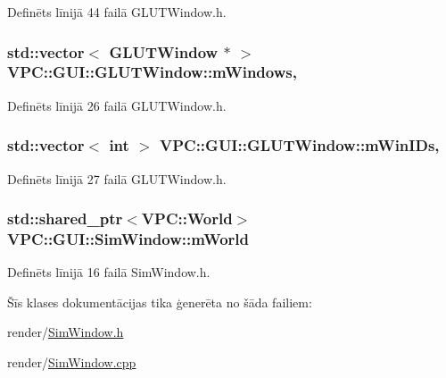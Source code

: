 Definēts līnijā 44 failā G\+L\+U\+T\+Window.\+h.

\subsubsection[{\texorpdfstring{m\+Windows}{mWindows}}]{\setlength{\rightskip}{0pt plus 5cm}std\+::vector$<$ {\bf G\+L\+U\+T\+Window} $\ast$ $>$ V\+P\+C\+::\+G\+U\+I\+::\+G\+L\+U\+T\+Window\+::m\+Windows\hspace{0.3cm}{\ttfamily [static]}, {\ttfamily [inherited]}}\hypertarget{class_v_p_c_1_1_g_u_i_1_1_g_l_u_t_window_aad2948c3a88afb3bc03f9bc54a81f285}{}\label{class_v_p_c_1_1_g_u_i_1_1_g_l_u_t_window_aad2948c3a88afb3bc03f9bc54a81f285}


Definēts līnijā 26 failā G\+L\+U\+T\+Window.\+h.

\subsubsection[{\texorpdfstring{m\+Win\+I\+Ds}{mWinIDs}}]{\setlength{\rightskip}{0pt plus 5cm}std\+::vector$<$ int $>$ V\+P\+C\+::\+G\+U\+I\+::\+G\+L\+U\+T\+Window\+::m\+Win\+I\+Ds\hspace{0.3cm}{\ttfamily [static]}, {\ttfamily [inherited]}}\hypertarget{class_v_p_c_1_1_g_u_i_1_1_g_l_u_t_window_a1ceb7745b98f3497579a0f4e8288419e}{}\label{class_v_p_c_1_1_g_u_i_1_1_g_l_u_t_window_a1ceb7745b98f3497579a0f4e8288419e}


Definēts līnijā 27 failā G\+L\+U\+T\+Window.\+h.

\subsubsection[{\texorpdfstring{m\+World}{mWorld}}]{\setlength{\rightskip}{0pt plus 5cm}std\+::shared\+\_\+ptr$<${\bf V\+P\+C\+::\+World}$>$ V\+P\+C\+::\+G\+U\+I\+::\+Sim\+Window\+::m\+World}\hypertarget{class_v_p_c_1_1_g_u_i_1_1_sim_window_a8a2dc03c2b159164e3a1d27e6de8774d}{}\label{class_v_p_c_1_1_g_u_i_1_1_sim_window_a8a2dc03c2b159164e3a1d27e6de8774d}


Definēts līnijā 16 failā Sim\+Window.\+h.



Šīs klases dokumentācijas tika ģenerēta no šāda failiem\+:\begin{DoxyCompactItemize}
\item 
render/\hyperlink{_sim_window_8h}{Sim\+Window.\+h}\item 
render/\hyperlink{_sim_window_8cpp}{Sim\+Window.\+cpp}\end{DoxyCompactItemize}
